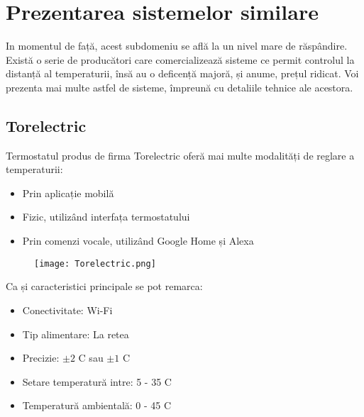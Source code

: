 \chapter{Prezentarea sistemelor similare}\label{ch:2sistemeSimilare}

	In momentul de față, acest subdomeniu se află la un nivel mare de răspândire. Există o serie de producători care comercializează sisteme ce permit controlul la distanță al temperaturii, însă au o deficență majoră, și anume, prețul ridicat. Voi prezenta mai multe astfel de sisteme, împreună cu detaliile tehnice ale acestora. 	

\section{Torelectric}
	Termostatul produs de firma Torelectric oferă mai multe modalități de reglare a temperaturii:
	\begin{itemize}
  	\setlength{\itemindent}{2em}
		\itemsep0em
		\item Prin aplicație mobilă
		\item Fizic, utilizând interfața termostatului
		\item Prin comenzi vocale, utilizând Google Home și Alexa
	\end{itemize}
	

	\begin{figure}[H]
    		\centering
    	\texttt{[image: Torelectric.png]}
	\end{figure}

	Ca și caracteristici principale se pot remarca:
	\begin{itemize}
	\setlength{\itemindent}{2em}
		\itemsep0em
		\item Conectivitate: Wi-Fi
		\item Tip alimentare: La retea
		\item Precizie: $\pm 2$ \textdegree{}C sau $\pm 1$ \textdegree{}C
		\item Setare temperatură intre: 5 - 35 \textdegree{}C
		\item Temperatură ambientală: 0 - 45 \textdegree{}C
	\end{itemize}


